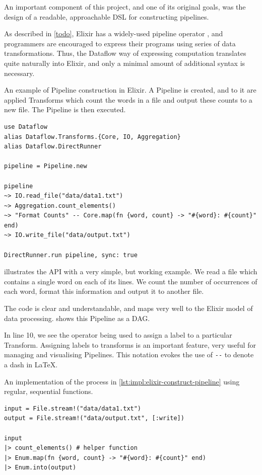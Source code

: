 An important component of this project, and one of its original goals, was the design of a readable, approachable DSL for constructing pipelines.

As described in \cref{todo}, Elixir has a widely-used pipeline operator \exs{|>}, and programmers are encouraged to express their programs using series of data transformations.
Thus, the Dataflow way of expressing computation translates quite naturally into Elixir, and only a minimal amount of additional syntax is necessary.

\begin{listing}[h]
	\caption{An example of Pipeline construction in Elixir. A Pipeline is created, and to it are applied Transforms which count the words in a file and output these counts to a new file. The Pipeline is then executed.}
	\label{lst:impl:elixir-construct-pipeline}
	\begin{verbatim}
use Dataflow
alias Dataflow.Transforms.{Core, IO, Aggregation}
alias Dataflow.DirectRunner

pipeline = Pipeline.new

pipeline
~> IO.read_file("data/data1.txt")
~> Aggregation.count_elements()
~> "Format Counts" -- Core.map(fn {word, count} -> "#{word}: #{count}" end)
~> IO.write_file("data/output.txt")

DirectRunner.run pipeline, sync: true

	\end{verbatim}
\end{listing}

 illustrates the API with a very simple, but working example.
We read a file which contains a single word on each of its lines.
We count the number of occurrences of each word, format this information and output it to another file.

The code is clear and understandable, and maps very well to the Elixir model of data processing.
 shows this Pipeline as a DAG.

In line 10, we see the \exs{--} operator being used to assign a label to a particular Transform.
Assigning labels to transforms is an important feature, very useful for managing and visualising Pipelines.
This notation evokes the use of \verb|--| to denote a dash in \LaTeX.

\begin{listing}[h]
	\caption{An implementation of the process in \cref{lst:impl:elixir-construct-pipeline} using regular, sequential functions.}
	\label{lst:impl:elixir-normal-comparison}
	\begin{verbatim}
input = File.stream!("data/data1.txt")
output = File.stream!("data/output.txt", [:write])

input
|> count_elements() # helper function
|> Enum.map(fn {word, count} -> "#{word}: #{count}" end)
|> Enum.into(output)
	\end{verbatim}
\end{listing}

